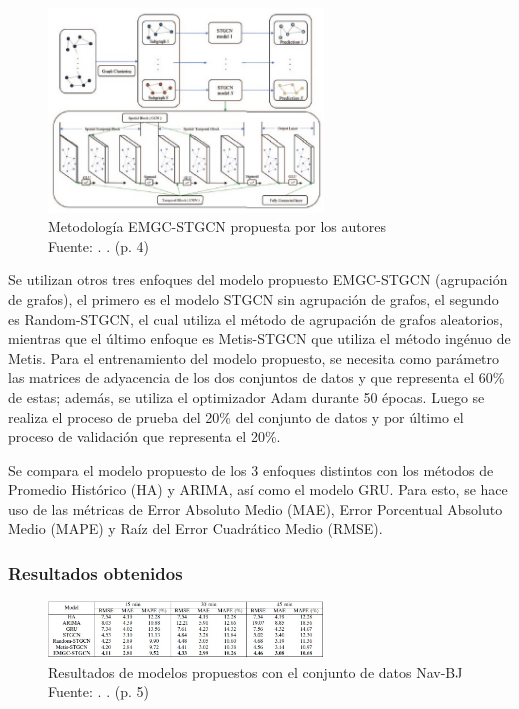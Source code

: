 \begin{figure}[h]
	\begin{center}
		\includegraphics[width=0.65\textwidth]{2/figures/CLUSTER.jpg}
		\caption{Metodología EMGC-STGCN propuesta por los autores \\
			Fuente: \citep*{pr_zhang}. . (p. 4)}
		\label{1:fig2}
	\end{center}
\end{figure}

Se utilizan otros tres enfoques del modelo propuesto EMGC-STGCN (agrupación de grafos), el primero es el modelo STGCN sin agrupación de grafos, el segundo es Random-STGCN, el cual utiliza el método de agrupación de grafos aleatorios, mientras que el último enfoque es Metis-STGCN que utiliza el método ingénuo de Metis. Para el entrenamiento del modelo propuesto, se necesita como parámetro las matrices de adyacencia de los dos conjuntos de datos y que representa el 60\% de estas; además, se utiliza el optimizador Adam durante 50 épocas. Luego se realiza el proceso de prueba del 20\% del conjunto de datos y por último el proceso de validación que representa el 20\%. 

Se compara el modelo propuesto de los 3 enfoques distintos con los métodos de Promedio Histórico (HA) y ARIMA, así como el modelo GRU. Para esto, se hace uso de las métricas de Error Absoluto Medio (MAE), Error Porcentual Absoluto Medio (MAPE) y Raíz del Error Cuadrático Medio (RMSE).

\subsubsection{Resultados obtenidos}
\begin{figure}[h]
	\begin{center}
		\includegraphics[width=0.65\textwidth]{2/figures/clusterRE1.jpg}
		\caption{Resultados de modelos propuestos con el conjunto de datos Nav-BJ \\
			Fuente: \citep*{pr_zhang}. . (p. 5)}
		\label{1:fig2}
	\end{center}
\end{figure}

